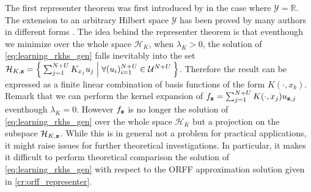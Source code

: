 The first representer theorem was first introduced by \citet{Wahba90} in the case where $\mathcal{Y}=\mathbb{R}$. The extension to an arbitrary Hilbert space $\mathcal{Y}$ has been proved by many authors in different forms \citep{Brouard2011,kadri2015operator,Micchelli2005}. The idea behind the representer theorem is that eventhough we minimize over the whole space $\mathcal{H}_K$, when $\lambda_K>0$, the solution of \cref{eq:learning_rkhs_gen} falls inevitably into the set $\mathcal{H}_{K, \boldsymbol{\mathbf{z}}}=\Set{\sum_{j=1}^{N+U}K_{x_j}u_j| \forall (u_i)_{i=1}^{N+U} \in\mathcal{U}^{N+U}}$. Therefore the result can be expressed as a finite linear combination of basis functions of the form $K(\cdot,x_k)$. Remark that we can perform the kernel expansion of $f_{\boldsymbol{\mathbf{z}}}=\sum_{j=1}^{N+U}K(\cdot,x_j)u_{\boldsymbol{\mathbf{z}},j}$ eventhough $\lambda_K=0$. However $f_{\boldsymbol{\mathbf{z}}}$ is no longer the solution of \cref{eq:learning_rkhs_gen} over the whole space $\mathcal{H}_K$ but a projection on the subspace $\mathcal{H}_{K, \boldsymbol{\mathbf{z}}}$. While this is in general not a problem for practical applications, it might raise issues for further theoretical investigations. In particular, it makes it difficult to perform theoretical comparison the  solution of \cref{eq:learning_rkhs_gen} with respect to the \acs{ORFF} approximation solution given in \cref{cr:orff_representer}.
